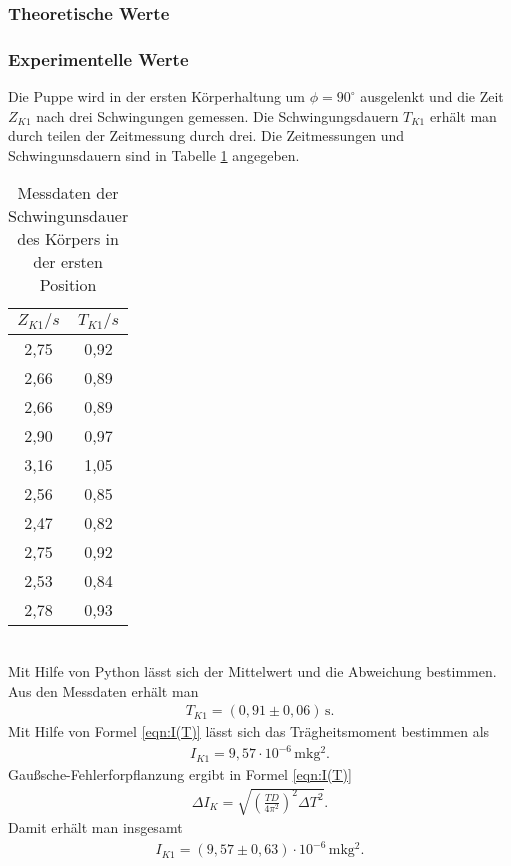 \subsubsection{Theoretische Werte}

\subsubsection{Experimentelle Werte}
Die Puppe wird in der ersten Körperhaltung um $\phi = 90^{\circ}$ ausgelenkt und die Zeit $Z_{K1}$ nach drei
Schwingungen gemessen. Die Schwingungsdauern $T_{K1}$ erhält man durch teilen der Zeitmessung durch drei. Die Zeitmessungen und
Schwingunsdauern sind in Tabelle \ref{tab:Koerper1} angegeben.
\begin{table}
  \centering
  \caption{Messdaten der Schwingunsdauer des Körpers in der ersten Position}
  \label{tab:Koerper1}
  \begin{tabular}{c c}
    \toprule
    $Z_{K1}/s$ & $T_{K1}/s$ \\
    \midrule
    2,75 & 0,92 \\
    2,66 & 0,89 \\
    2,66 & 0,89 \\
    2,90 & 0,97 \\
    3,16 & 1,05 \\
    2,56 & 0,85 \\
    2,47 & 0,82 \\
    2,75 & 0,92 \\
    2,53 & 0,84 \\
    2,78 & 0,93 \\
    \bottomrule
  \end{tabular}
\end{table}
\\
Mit Hilfe von Python lässt sich der Mittelwert und die Abweichung bestimmen. Aus den Messdaten
erhält man
\begin{align*}
  T_{K1} = (0{,}91 \pm 0{,}06)\, \mathrm{s} .
\end{align*}
Mit Hilfe von Formel \ref{eqn:I(T)} lässt sich das Trägheitsmoment bestimmen als
\begin{align*}
  I_{K1} = 9{,}57 \cdot 10^{-6}\, \mathrm{mkg^2}.
\end{align*}
Gaußsche-Fehlerforpflanzung ergibt in Formel \ref{eqn:I(T)}
\begin{align}
  \label{eqn:K_Gauss}
  \Delta I_{K} = \sqrt{\left(\frac{TD}{4\pi^2}\right)^2 \Delta T^2}.
\end{align}
Damit erhält man insgesamt
\begin{align*}
  I_{K1} = (9{,}57 \pm 0{,}63) \cdot 10^{-6}\, \mathrm{mkg^2}.
\end{align*}

